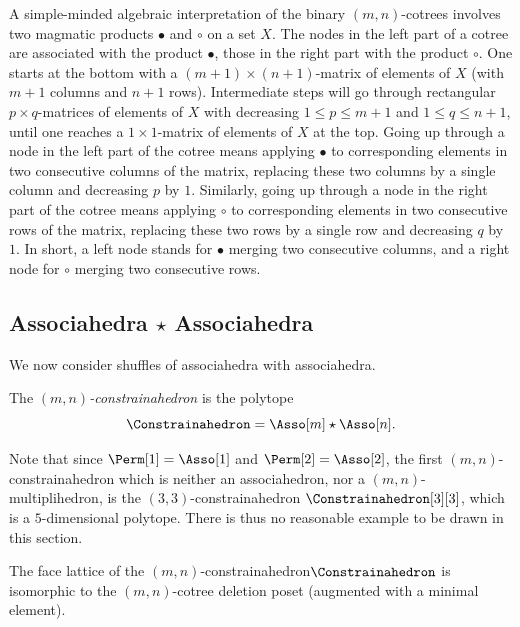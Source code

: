 \documentclass[AHL,Unicode,longabstracts,published]{cedram}
\newcommand{\shuffleDP}{\star} %
\begin{document}
\begin{rema}\label{rem:algebraicInterpretationConstrainahedraBis}
A simple-minded algebraic interpretation of the binary $(m,n)$-cotrees involves two magmatic products $\bullet$ and $\circ$ on a set $X$. The nodes in the left part of a cotree are associated with the product $\bullet$, those in the right part with the product $\circ$. One starts at the bottom with a $(m+1) \times (n+1)$-matrix of elements of $X$ (with $m+1$ columns and $n+1$ rows). Intermediate steps will go through rectangular $p \times q$-matrices of elements of $X$ with decreasing $1 \le p \le m+1$ and $1 \le q \le n+1$, until one reaches a $1 \times 1$-matrix of elements of $X$ at the top. Going up through a node in the left part of the cotree means applying $\bullet$ to corresponding elements in two consecutive columns of the matrix, replacing these two columns by a single column and decreasing $p$ by $1$. Similarly, going up through a node in the right part of the cotree means applying $\circ$ to corresponding elements in two consecutive rows of the matrix, replacing these two rows by a single row and decreasing $q$ by $1$. In short, a left node stands for $\bullet$ merging two consecutive columns, and a right node for $\circ$ merging two consecutive rows.
\end{rema}



\subsection{Associahedra \texorpdfstring{$\shuffleDP$}{shuffleDP} Associahedra}\label{subsec:constrainahedra}

We now consider shuffles of associahedra with associahedra.

\begin{defi}\label{def:constrainahedron}
The
\emph{$(m,n)$-constrainahedron} is the polytope
\[
\Constrainahedron = \Asso[m] \shuffleDP \Asso[n].
\]
\end{defi}

Note that since $\Perm[1] = \Asso[1]$ and $\Perm[2] = \Asso[2]$, the first $(m,n)$-constrainahedron which is neither an associahedron, nor a $(m,n)$-multiplihedron, is the $(3,3)$-constrainahedron $\Constrainahedron[3][3]$, which is a $5$-dimensional polytope. There is thus no reasonable example to be drawn in this section.

\begin{prop}\label{prop:faceLatticeConstrainahedron}
The face lattice of the $(m,n)$-constrainahedron\linebreak $\Constrainahedron$ is isomorphic to the $(m,n)$-cotree deletion poset (augmented with a minimal element).
\end{prop}
\end{document}

